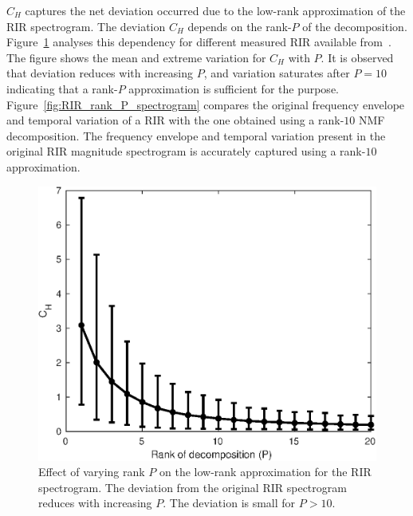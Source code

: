  
$C_{H}$ captures the net deviation occurred due to the low-rank approximation of the RIR spectrogram. The deviation $C_{H}$ depends on the rank-$P$ of the decomposition. Figure~\ref{fig:cost_rank_P_approximation} analyses this dependency for different measured RIR available from~\cite{kinoshita2016summary}. The figure shows the mean and extreme variation for $C_{H}$ with $P$. It is observed that deviation reduces with increasing $P$, and variation saturates after $P=10$ indicating that a rank-$P$ approximation is sufficient for the purpose. 
Figure~\ref{fig:RIR_rank_P_spectrogram} compares the original frequency envelope and temporal variation of a RIR with the one obtained using a rank-$10$ NMF decomposition. The frequency envelope and temporal variation present in the original RIR magnitude spectrogram is accurately captured using a rank-$10$ approximation.
\begin{figure}[ht]
\centering
\includegraphics[width=\linewidth]{fig/RIR_NMF_approx_cost_error_plot.eps}
\caption{Effect of varying rank $P$ on the low-rank approximation for the RIR spectrogram. The deviation from the original RIR spectrogram reduces with increasing $P$. The deviation is small for $P>10$.}
\label{fig:cost_rank_P_approximation}
\end{figure}

